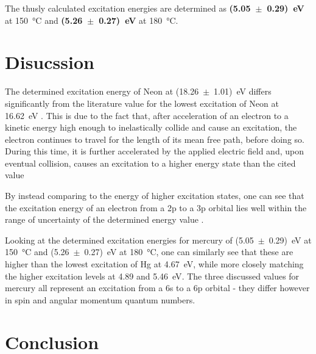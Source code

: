 \documentclass[titlepage]{article}
\begin{document}
The thusly calculated excitation energies are determined as \textbf{(5.05~\(\pm\)~0.29)~eV} at 150~°C and \textbf{(5.26~\(\pm\)~0.27)~eV} at 180~°C.

\section{Disucssion}
The determined excitation energy of Neon at (18.26~\(\pm\)~1.01)~eV differs significantly from the literature value for the lowest excitation of Neon at 16.62~eV \autocite{Ne_Energies}. This is due to the fact that, after acceleration of an electron to a kinetic energy high enough to inelastically collide and cause an excitation, the electron continues to travel for the length of its mean free path, before doing so. During this time, it is further accelerated by the applied electric field and, upon eventual collision, causes an excitation to a higher energy state than the cited value \autocite{New_Features_of_FH_Exp}

By instead comparing to the energy of higher excitation states, one can see that the excitation energy of an electron from a 2p to a 3p orbital lies well within the range of uncertainty of the determined energy value \autocite{Ne_Energies}.

Looking at the determined excitation energies for mercury of (5.05~\(\pm\)~0.29)~eV at 150~°C and (5.26~\(\pm\)~0.27)~eV at 180~°C, one can similarly see that these are higher than the lowest excitation of Hg at 4.67~eV, while more closely matching the higher excitation levels at 4.89 and 5.46~eV\autocite{Hg_Energies}. The three discussed values for mercury all represent an excitation from a 6s to a 6p orbital - they differ however in spin and angular momentum quantum numbers.



\section{Conclusion}

\newpage
\printbibliography
\end{document}
